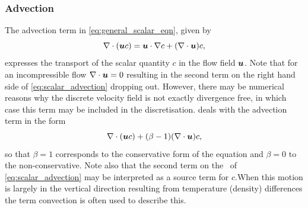 \subsubsection{Advection}
The advection term in \eqref{eq:general_scalar_eqn}, given by
\begin{equation}\label{eq:scalar_advection}
\nabla\cdot({\mbox{\boldmath$u$}} c) = {\mbox{\boldmath$u$}}\cdot\nabla c + (\nabla\cdot{\mbox{\boldmath$u$}})c,
\end{equation}
expresses the transport of the scalar quantity $c$ in the flow field ${\mbox{\boldmath$u$}}$. Note that for an incompressible flow $\nabla\cdot{\mbox{\boldmath$u$}}=0$ resulting in the second term on the right hand side of \eqref{eq:scalar_advection} dropping out. However, there may be numerical
reasons why the discrete velocity field is not exactly divergence free, in which case this term may
be included in the discretisation. {\fluidity} deals with the advection term in the form
\begin{equation}\label{eq:fluidity_scalar_advection}
\nabla\cdot({\mbox{\boldmath$u$}} c) + (\beta-1)(\nabla\cdot{\mbox{\boldmath$u$}})c,
\end{equation}
so that $\beta=1$ corresponds to the conservative form of the equation and $\beta=0$ to the non-conservative. Note also that the second term on
the \rhs\ of \eqref{eq:scalar_advection} may be interpreted as a source term for $c$.When this motion is largely in the vertical direction resulting from temperature (density) differences the term convection is often used to describe this.

